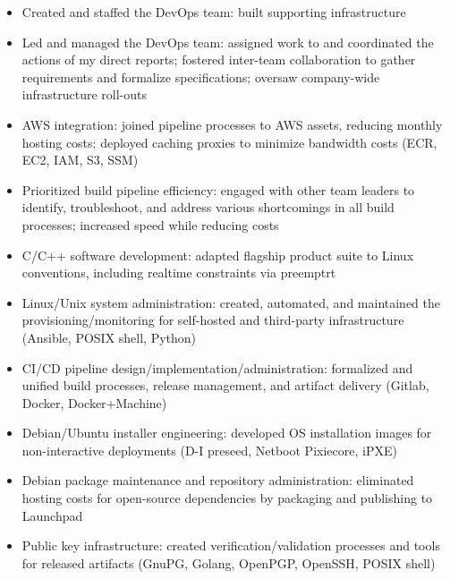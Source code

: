 \documentclass[letterpaper,10pt]{article}
\begin{document}

\begin{itemize}

\item
  Created and staffed the DevOps team: built supporting infrastructure
\item
  Led and managed the DevOps team: assigned work to and coordinated the actions
  of my direct reports; fostered inter-team collaboration to gather
  requirements and formalize specifications; oversaw company-wide
  infrastructure roll-outs
\item
  AWS integration: joined pipeline processes to AWS assets, reducing monthly
  hosting costs; deployed caching proxies to minimize bandwidth costs (ECR,
  EC2, IAM, S3, SSM)
\item
  Prioritized build pipeline efficiency: engaged with other team leaders to
  identify, troubleshoot, and address various shortcomings in all build
  processes; increased speed while reducing costs
\item
  C/C++ software development: adapted flagship product suite to Linux
  conventions, including realtime constraints via preemptrt
\item
  Linux/Unix system administration: created, automated, and maintained the
  provisioning/monitoring for self-hosted and third-party infrastructure
  (Ansible, POSIX shell, Python)
\item
  CI/CD pipeline design/implementation/administration: formalized and unified
  build processes, release management, and artifact delivery (Gitlab, Docker,
  Docker+Machine)
\item
  Debian/Ubuntu installer engineering: developed OS installation images for
  non-interactive deployments (D-I preseed, Netboot Pixiecore, iPXE)
\item
  Debian package maintenance and repository administration: eliminated hosting
  costs for open-source dependencies by packaging and publishing to Launchpad
\item
  Public key infrastructure: created verification/validation processes and
  tools for released artifacts (GnuPG, Golang, OpenPGP, OpenSSH, POSIX shell)

\end{itemize}

\end{document}

